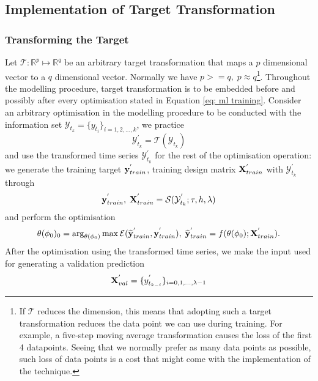 \subsection{Implementation of Target Transformation}\label{subsec: target transformation procedure}

\subsubsection{Transforming the Target}
Let $\mathcal{T}: \mathbb{R}^p \longmapsto \mathbb{R}^q$ be an arbitrary target transformation that maps a $p$ dimensional vector to a $q$ dimensional vector. Normally we have $p >= q, \; p \approx q$\footnote{If $\mathcal{T}$ reduces the dimension, this means that adopting such a target transformation reduces the data point we can use during training. For example, a five-step moving average transformation causes the loss of the first 4 datapoints. Seeing that we normally prefer as many data points as possible, such loss of data points is a cost that might come with the implementation of the technique.}. Throughout the modelling procedure, target transformation is to be embedded before and possibly after every optimisation stated in Equation \ref{eq: ml training}. Consider an arbitrary optimisation in the modelling procedure to be conducted with the information set $\mathcal{Y}_{t_k} = \{ y_{t_i} \}_{i = 1, 2, \ldots, k}$, we practice
\begin{equation*}
    \mathcal{Y}^{'}_{t_k} = \mathcal{T}(\mathcal{Y}_{t_k})
\end{equation*}
and use the transformed time series $\mathcal{Y}^{'}_{t_k}$ for the rest of the optimisation operation: we generate the training target $\mathbf{y}^{'}_{train}$, training design matrix $\mathbf{X}^{'}_{train}$ with $\mathcal{Y}^{'}_{t_k}$ through
\begin{equation*}
    \mathbf{y}^{'}_{train}, \; \mathbf{X}^{'}_{train} = \mathcal{S}(\mathcal{Y}^{'}_{t_k}; \tau, h, \lambda)
\end{equation*}
and perform the optimisation
\begin{equation*}
    \theta(\phi_0)_0 = \arg_{\theta(\phi_0)} \max \mathcal{E}(\widehat{\mathbf{y}}^{'}_{train}, \mathbf{y}^{'}_{train}), \; \widehat{\mathbf{y}}^{'}_{train} = f(\theta(\phi_0); \mathbf{X}^{'}_{train}).
\end{equation*}
After the optimisation using the transformed time series, we make the input used for generating a validation prediction
\begin{equation*}
    \mathbf{X}^{'}_{val} = \{y^{'}_{t_{k-i}} \}_{i = 0, 1, \ldots, \lambda-1}
\end{equation*}
